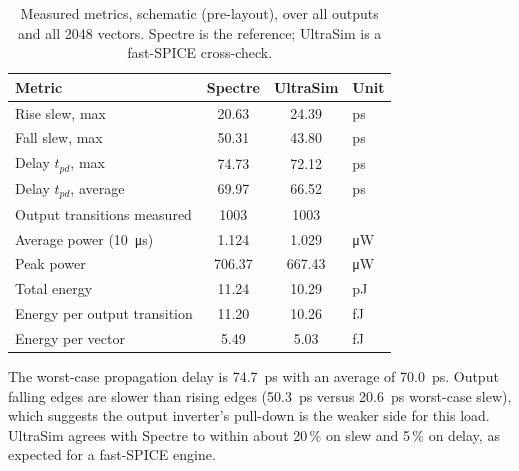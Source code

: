 \documentclass[11pt]{article}
\begin{document}
\begin{table}[H]
\centering
\caption{Measured metrics, schematic (pre-layout), over all outputs and all
2048 vectors. Spectre is the reference; UltraSim is a fast-SPICE cross-check.}
\label{tab:results}
\begin{tabular}{l S[table-format=3.2] S[table-format=3.2] l}
\toprule
Metric & {Spectre} & {UltraSim} & Unit \\
\midrule
Rise slew, max                    & 20.63  & 24.39  & ps \\
Fall slew, max                    & 50.31  & 43.80  & ps \\
Delay $t_{pd}$, max               & 74.73  & 72.12  & ps \\
Delay $t_{pd}$, average           & 69.97  & 66.52  & ps \\
Output transitions measured       & {1003} & {1003} & \\
\midrule
Average power (\SI{10}{\micro s}) & 1.124  & 1.029  & \si{\micro W} \\
Peak power                        & 706.37 & 667.43 & \si{\micro W} \\
Total energy                      & 11.24  & 10.29  & pJ \\
Energy per output transition      & 11.20  & 10.26  & fJ \\
Energy per vector                 & 5.49   & 5.03   & fJ \\
\bottomrule
\end{tabular}
\end{table}

The worst-case propagation delay is \SI{74.7}{ps} with an average of
\SI{70.0}{ps}. Output falling edges are slower than rising edges
(\SI{50.3}{ps} versus \SI{20.6}{ps} worst-case slew), which suggests the
output inverter's pull-down is the weaker side for this load. UltraSim agrees with
Spectre to within about 20\,\% on slew and 5\,\% on delay, as expected for a
fast-SPICE engine.
\end{document}
